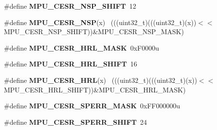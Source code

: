 \begin{DoxyCompactItemize}
\item 
\hypertarget{group___m_p_u___register___masks_ga3c9da72b898ef6552faa993528e58157}{}\#define {\bfseries M\+P\+U\+\_\+\+C\+E\+S\+R\+\_\+\+N\+S\+P\+\_\+\+S\+H\+I\+F\+T}~12\label{group___m_p_u___register___masks_ga3c9da72b898ef6552faa993528e58157}

\item 
\hypertarget{group___m_p_u___register___masks_ga5639f383deeba2d71767b811cb8998da}{}\#define {\bfseries M\+P\+U\+\_\+\+C\+E\+S\+R\+\_\+\+N\+S\+P}(x)                                                ~(((uint32\+\_\+t)(((uint32\+\_\+t)(x))$<$$<$M\+P\+U\+\_\+\+C\+E\+S\+R\+\_\+\+N\+S\+P\+\_\+\+S\+H\+I\+F\+T))\&M\+P\+U\+\_\+\+C\+E\+S\+R\+\_\+\+N\+S\+P\+\_\+\+M\+A\+S\+K)\label{group___m_p_u___register___masks_ga5639f383deeba2d71767b811cb8998da}

\item 
\hypertarget{group___m_p_u___register___masks_gac91de83bf386f4896d634b4283e3ac12}{}\#define {\bfseries M\+P\+U\+\_\+\+C\+E\+S\+R\+\_\+\+H\+R\+L\+\_\+\+M\+A\+S\+K}~0x\+F0000u\label{group___m_p_u___register___masks_gac91de83bf386f4896d634b4283e3ac12}

\item 
\hypertarget{group___m_p_u___register___masks_ga9e19f94c8fa7c703ae194f8df2920795}{}\#define {\bfseries M\+P\+U\+\_\+\+C\+E\+S\+R\+\_\+\+H\+R\+L\+\_\+\+S\+H\+I\+F\+T}~16\label{group___m_p_u___register___masks_ga9e19f94c8fa7c703ae194f8df2920795}

\item 
\hypertarget{group___m_p_u___register___masks_ga766ed7d8ee03f0a9ede81c0f88604bff}{}\#define {\bfseries M\+P\+U\+\_\+\+C\+E\+S\+R\+\_\+\+H\+R\+L}(x)                                                ~(((uint32\+\_\+t)(((uint32\+\_\+t)(x))$<$$<$M\+P\+U\+\_\+\+C\+E\+S\+R\+\_\+\+H\+R\+L\+\_\+\+S\+H\+I\+F\+T))\&M\+P\+U\+\_\+\+C\+E\+S\+R\+\_\+\+H\+R\+L\+\_\+\+M\+A\+S\+K)\label{group___m_p_u___register___masks_ga766ed7d8ee03f0a9ede81c0f88604bff}

\item 
\hypertarget{group___m_p_u___register___masks_ga92110b62cfcd6178c2b26e7aaef222b1}{}\#define {\bfseries M\+P\+U\+\_\+\+C\+E\+S\+R\+\_\+\+S\+P\+E\+R\+R\+\_\+\+M\+A\+S\+K}~0x\+F\+F000000u\label{group___m_p_u___register___masks_ga92110b62cfcd6178c2b26e7aaef222b1}

\item 
\hypertarget{group___m_p_u___register___masks_ga69779e128c116e87116f7aa67b9a8dcc}{}\#define {\bfseries M\+P\+U\+\_\+\+C\+E\+S\+R\+\_\+\+S\+P\+E\+R\+R\+\_\+\+S\+H\+I\+F\+T}~24\label{group___m_p_u___register___masks_ga69779e128c116e87116f7aa67b9a8dcc}


\end{DoxyCompactItemize}
